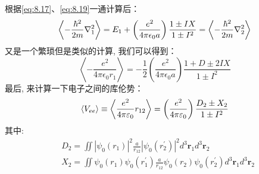 \documentclass[a4paper,zihao=-4,linespread=1]{ctexrep}
\begin{document}
    根据\ref{eq:8.17}、\ref{eq:8.19}一通计算后：
    \begin{equation}
        \Braket{-\frac{\hbar^{2}}{2 m} \nabla_{1}^{2}}=E_{1}+\left(\frac{e^{2}}{4 \pi \epsilon_{0} a}\right) \frac{1 \pm I X}{1 \pm I^{2}}=\Braket{-\frac{\hbar^{2}}{2 m} \nabla_{2}^{2}}
    \end{equation}
    又是一个繁琐但是类似的计算, 我们可以得到：
    \begin{equation}
        \left\langle-\frac{e^{2}}{4 \pi \epsilon_{0} r_{1}}\right\rangle=-\frac{1}{2}\left(\frac{e^{2}}{4 \pi \epsilon_{0} a}\right) \frac{1+D \pm 2 I X}{1 \pm I^{2}}
    \end{equation}
    最后, 来计算一下电子之间的库伦势：
    \begin{equation}
        \braket{V_{ee}}\equiv\Braket{\frac{e^2}{4\pi\varepsilon_0}r_{12}}=\left(\frac{e^2}{4\pi\varepsilon_0}\right)\frac{D_2\pm X_2}{1\pm I^2}
    \end{equation}
    其中:
    \begin{equation}
        \begin{aligned}
            &D_{2}=\iint\left|\psi_{0}\left(r_{1}\right)\right|^{2} \frac{a}{r_{12}}\left|\psi_{0}\left(r_{2}^{\prime}\right)\right|^{2} d^{3} \mathbf{r}_{1} d^{3} \mathbf{r}_{2} \\
            &X_{2}=\iint \psi_{0}\left(r_{1}\right) \psi_{0}\left(r_{1}^{\prime}\right) \frac{a}{r_{12}} \psi_{0}\left(r_{2}\right) \psi_{0}\left(r_{2}^{\prime}\right) d^{3} \mathbf{r}_{1} d^{3} \mathbf{r}_{2}
        \end{aligned}
    \end{equation}
\end{document}
